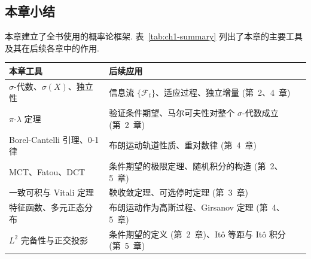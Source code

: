 \subsection*{本章小结}

本章建立了全书使用的概率论框架. 表~\ref{tab:ch1-summary} 列出了本章的主要工具及其在后续各章中的作用.

\begin{center}
\label{tab:ch1-summary}
\renewcommand{\arraystretch}{1.4}
\begin{tabular}{>{\raggedright\arraybackslash}p{} >{\raggedright\arraybackslash}p{}}
\toprule
本章工具 & 后续应用 \\
\midrule
$\sigma$-代数、$\sigma(X)$、独立性 & 信息流 $\{\mathcal{F}_t\}$、适应过程、独立增量 (第~2、4~章) \\
$\pi$-$\lambda$ 定理 & 验证条件期望、马尔可夫性对整个 $\sigma$-代数成立 (第~2~章) \\
Borel-Cantelli 引理、0-1 律 & 布朗运动轨道性质、重对数律 (第~4~章) \\
MCT、Fatou、DCT & 条件期望的极限定理、随机积分的构造 (第~2、5~章) \\
一致可积与 Vitali 定理 & 鞅收敛定理、可选停时定理 (第~3~章) \\
特征函数、多元正态分布 & 布朗运动作为高斯过程、Girsanov 定理 (第~4、5~章) \\
$L^2$ 完备性与正交投影 & 条件期望的定义 (第~2~章)、Itô 等距与 Itô 积分 (第~5~章) \\
\bottomrule
\end{tabular}
\end{center}
